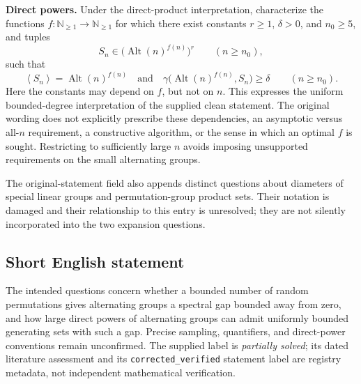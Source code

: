 \documentclass[11pt]{article}
\newcommand{\N}{\mathbb{N}}
\begin{document}
\textbf{Direct powers.} Under the direct-product interpretation, characterize the functions \(f:\N_{\ge1}\to\N_{\ge1}\) for which there exist constants \(r\ge1\), \(\delta>0\), and \(n_0\ge5\), and tuples
\[
 S_n\in\bigl(\operatorname{Alt}(n)^{f(n)}\bigr)^r\qquad(n\ge n_0),
\]
such that
\[
 \left\langle S_n\right\rangle=\operatorname{Alt}(n)^{f(n)}
 \quad\text{and}\quad
 \gamma\bigl(\operatorname{Alt}(n)^{f(n)},S_n\bigr)\ge\delta
 \qquad(n\ge n_0).
\]
Here the constants may depend on \(f\), but not on \(n\). This expresses the uniform bounded-degree interpretation of the supplied clean statement. The original wording does not explicitly prescribe these dependencies, an asymptotic versus all-\(n\) requirement, a constructive algorithm, or the sense in which an optimal \(f\) is sought. Restricting to sufficiently large \(n\) avoids imposing unsupported requirements on the small alternating groups.

The original-statement field also appends distinct questions about diameters of special linear groups and permutation-group product sets. Their notation is damaged and their relationship to this entry is unresolved; they are not silently incorporated into the two expansion questions.
\subsection{Short English statement}
The intended questions concern whether a bounded number of random permutations gives alternating groups a spectral gap bounded away from zero, and how large direct powers of alternating groups can admit uniformly bounded generating sets with such a gap. Precise sampling, quantifiers, and direct-power conventions remain unconfirmed. The supplied label is \emph{partially solved}; its dated literature assessment and its \texttt{corrected\_verified} statement label are registry metadata, not independent mathematical verification.
\end{document}
